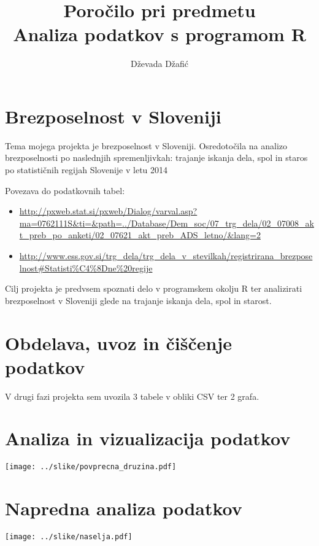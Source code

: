 \documentclass[11pt,a4paper]{article}
\begin{document}
\title{Poročilo pri predmetu \\
Analiza podatkov s programom R}
\author{Dževada Džafić}
\maketitle

\section{Brezposelnost v Sloveniji}

Tema mojega projekta je brezposelnost v Sloveniji. Osredotočila na analizo brezposelnosti po naslednjih spremenljivkah: trajanje iskanja dela, spol in staros po statističnih regijah Slovenije v letu 2014

Povezava do podatkovnih tabel:
\begin{itemize}

\item \url{http://pxweb.stat.si/pxweb/Dialog/varval.asp?ma=0762111S&ti=&path=../Database/Dem_soc/07_trg_dela/02_07008_akt_preb_po_anketi/02_07621_akt_preb_ADS_letno/&lang=2}
\item \url{http://www.ess.gov.si/trg_dela/trg_dela_v_stevilkah/registrirana_brezposelnost#Statisti%C4%8Dne%20regije}

\end{itemize}

Cilj projekta je predvsem spoznati delo v programskem okolju R ter analizirati brezposelnost v Sloveniji glede na trajanje iskanja dela, spol in starost.


\section{Obdelava, uvoz in čiščenje podatkov}

V drugi fazi projekta sem uvozila 3 tabele v obliki CSV ter 2 grafa.

\section{Analiza in vizualizacija podatkov}

\texttt{[image: ../slike/povprecna\_druzina.pdf]}

\section{Napredna analiza podatkov}

\texttt{[image: ../slike/naselja.pdf]}
\end{document}

